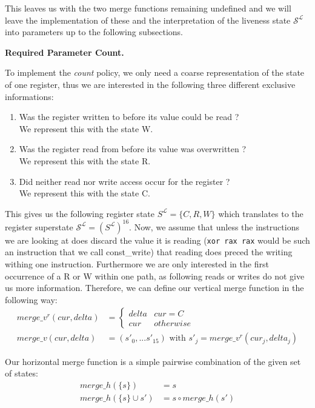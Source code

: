 This leaves us with the two merge functions remaining undefined and we will leave the implementation of these and the interpretation of the liveness state $\mathcal{S}^\mathcal{L}$ into parameters up to the following subsections.

\textbf{Required Parameter Count.}
\label{subsection:requiredparamcount}

To implement the \emph{count} policy, we only need a coarse representation of the state of one register, thus we are interested in the following three different exclusive informations:
\begin{enumerate}
\item Was the register written to before its value could be read ? \\ We represent this with the state W.
\item Was the register read from before its value was overwritten ? \\ We represent this with the state R.
\item Did neither read nor write access occur for the register ? \\ We represent this with the state C.
\end{enumerate}
This gives us the following register state $S^\mathcal{L} = \{ C, R, W \}$ which translates to the register superstate $\mathcal{S}^\mathcal{L} = (S^\mathcal{L})^{16}$.
Now, we assume that unless the instructions we are looking at does discard the value it is reading (\texttt{xor rax rax} would be such an instruction that we call const\_write) that reading does preced the writing withing one instruction. Furthermore we are only interested in the first occurrence of a R or W within one path, as following reads or writes do not give us more information.
Therefore, we can define our vertical merge function in the following way:
\begin{align}
merge\_v^{r} (cur, delta) &= \left\{
  \begin{array}{lr}
     delta & cur = C \\
     cur & otherwise
  \end{array}
\right. \\
merge\_v (cur, delta) &= (s'_0, ... s'_15) \text { with } s'_j = merge\_v^{r}(cur_j, delta_j)
\end{align}


Our horizontal merge function is a simple pairwise combination of the given set of states:
\begin{align}
merge\_h(\{s\}) &= s\\
merge\_h(\{s\} \cup s') &= s \circ merge\_h(s')
\end{align}

